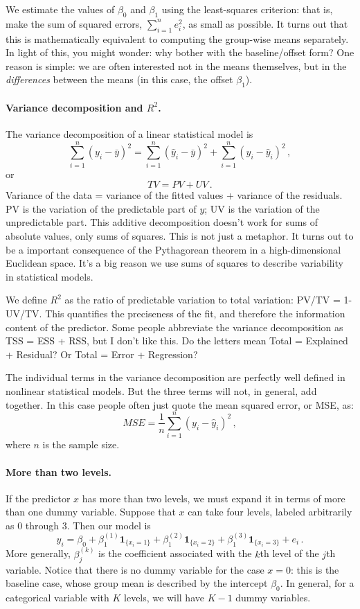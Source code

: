 \documentclass[11pt]{article}
\newcommand{\1}[1]{\mathbf{1}_{\{ {#1} \}}}
\begin{document}
We estimate the values of $\beta_0$ and $\beta_1$ using the least-squares criterion: that is, make the sum of squared errors, $\sum_{i=1}^n e_i^2$, as small as possible.  It turns out that this is mathematically equivalent to computing the group-wise means separately.  In light of this, you might wonder: why bother with the baseline/offset form? One reason is simple: we are often interested not in the means themselves, but in 
the \textit{differences} between the means (in this case, the offset $\beta_1$).


\paragraph{Variance decomposition and $R^2$.}

The variance decomposition of a linear statistical model is
$$
\sum_{i=1}^n (y_i - \bar{y})^2 = \sum_{i=1}^n (\hat{y}_i - \bar{y})^2 + \sum_{i=1}^n (y_i - \hat{y}_i)^2 \, ,
$$
or
$$
TV = PV + UV \, .
$$
Variance of the data = variance of the fitted values + variance of the residuals.  PV is the variation of the predictable part of $y$; UV is the variation of the unpredictable part.  This additive decomposition doesn't work for sums of absolute values, only sums of squares.  This is not just a metaphor.  It turns out to be a important consequence of the Pythagorean theorem in a high-dimensional Euclidean space.  It's a big reason we use sums of squares to describe variability in statistical models.

We define $R^2$ as the ratio of predictable variation to total variation: PV/TV = 1-UV/TV.  This quantifies the preciseness of the fit, and therefore the information content of the predictor.  Some people abbreviate the variance decomposition as TSS = ESS + RSS, but I don't like this.  Do the letters mean Total = Explained + Residual?  Or Total = Error + Regression?

The individual terms in the variance decomposition are perfectly well defined in nonlinear statistical models.  But the three terms will not, in general, add together.  In this case people often just quote the mean squared error, or MSE, as:
$$
MSE = \frac{1}{n} \sum_{i=1}^n (y_i - \hat{y}_i)^2 \, ,
$$
where $n$ is the sample size.


\paragraph{More than two levels.}

If the predictor $x$ has more than two levels, we must expand it in terms of more than one dummy variable.  Suppose that $x$ can take four levels, labeled arbitrarily as $0$ through $3$.  Then our model is
$$
y_i = \beta_0 + \beta_1^{(1)} \1{x_i=1} + \beta_1^{(2)} \1{x_i=2} + \beta_1^{(3)} \1{x_i=3} + e_i \, .
$$
More generally, $\beta_j^{(k)}$ is the coefficient associated with the $k$th level of the $j$th variable.  Notice that there is no dummy variable for the case $x = 0$: this is the baseline case, whose group mean is described by the intercept $\beta_0$.  In general, for a categorical variable with $K$ levels, we will have $K-1$ dummy variables.
\end{document}
